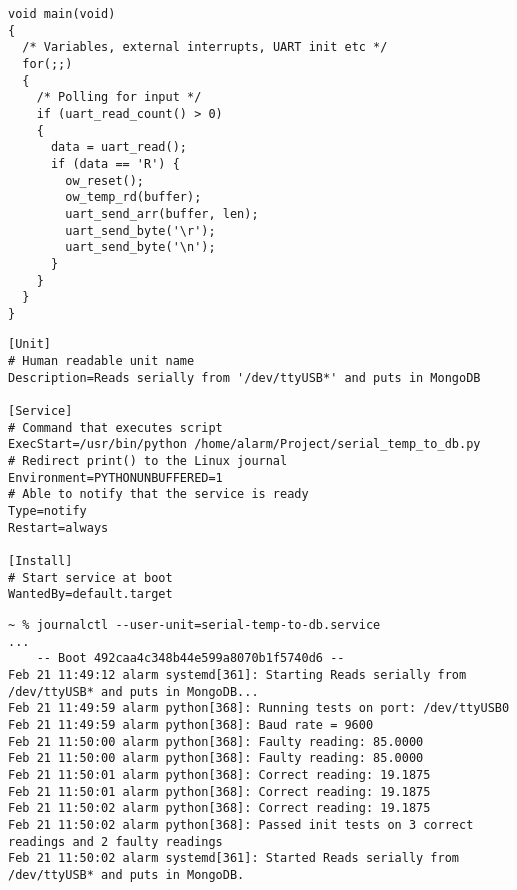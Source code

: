 \documentclass[aspectratio=169, 9pt]{uu-beamer}
\begin{document}

\begin{frame}[fragile]
    \begin{lstlisting}[caption={MCU program loop}, label={main}]
void main(void)
{
  /* Variables, external interrupts, UART init etc */
  for(;;)
  {
    /* Polling for input */
    if (uart_read_count() > 0)
    {
      data = uart_read();
      if (data == 'R') {
        ow_reset();
        ow_temp_rd(buffer);
        uart_send_arr(buffer, len);
        uart_send_byte('\r');
        uart_send_byte('\n');
      }
    }
  }
}
    \end{lstlisting}
\end{frame}

\begin{frame}[fragile]
\begin{lstlisting}[caption={The systemd service that manages data collection}, label={systemd}]
[Unit]
# Human readable unit name
Description=Reads serially from '/dev/ttyUSB*' and puts in MongoDB

[Service]
# Command that executes script
ExecStart=/usr/bin/python /home/alarm/Project/serial_temp_to_db.py
# Redirect print() to the Linux journal
Environment=PYTHONUNBUFFERED=1
# Able to notify that the service is ready
Type=notify
Restart=always

[Install]
# Start service at boot
WantedBy=default.target
\end{lstlisting}
\end{frame}

\begin{frame}[fragile]
    \begin{lstlisting}[caption={Init tests logged in the journal}, label={journal}]
~ % journalctl --user-unit=serial-temp-to-db.service
...
    -- Boot 492caa4c348b44e599a8070b1f5740d6 --
Feb 21 11:49:12 alarm systemd[361]: Starting Reads serially from /dev/ttyUSB* and puts in MongoDB...
Feb 21 11:49:59 alarm python[368]: Running tests on port: /dev/ttyUSB0
Feb 21 11:49:59 alarm python[368]: Baud rate = 9600
Feb 21 11:50:00 alarm python[368]: Faulty reading: 85.0000
Feb 21 11:50:00 alarm python[368]: Faulty reading: 85.0000
Feb 21 11:50:01 alarm python[368]: Correct reading: 19.1875
Feb 21 11:50:01 alarm python[368]: Correct reading: 19.1875
Feb 21 11:50:02 alarm python[368]: Correct reading: 19.1875
Feb 21 11:50:02 alarm python[368]: Passed init tests on 3 correct readings and 2 faulty readings
Feb 21 11:50:02 alarm systemd[361]: Started Reads serially from /dev/ttyUSB* and puts in MongoDB.
    \end{lstlisting}
\end{frame}
\end{document}

